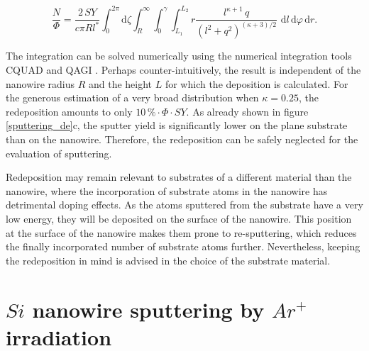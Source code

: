 \begin{equation}
\label{prob3}
\frac{N}{\Phi} = \frac{2\,SY}{c \pi Rl^*} \int_0^{2\pi}\! \mathrm{d}\zeta \int_R^{\infty} \!
\int_0^{\gamma} \! \int_{L_1}^{L_2} \! r \frac{l^{\kappa+1}\,q}{(l^2 + q^2)^{(\kappa + 3)/2}}\,\,\mathrm{d}l \, \mathrm{d}\varphi\,\mathrm{d}r.
\end{equation}

The integration can be solved numerically using the numerical integration tools CQUAD and QAGI \cite{gough_gnu_2009}. Perhaps counter-intuitively, the result is independent of the nanowire radius $R$ and the height $L$ for which the deposition is calculated. For the generous estimation of a very broad distribution when $\kappa = 0.25$, the redeposition amounts to only $10\,\% \cdot \Phi\cdot SY$. As already shown in figure \ref{sputtering_de}c, the sputter yield is significantly lower on the plane substrate than on the nanowire. Therefore, the redeposition can be safely neglected for the evaluation of sputtering. 

Redeposition may remain relevant to substrates of a different material than the nanowire, where the incorporation of substrate atoms in the nanowire has detrimental doping effects. As the atoms sputtered from the substrate have a very low energy, they will be deposited on the surface of the nanowire. This position at the surface of the nanowire makes them prone to re-sputtering, which reduces the finally incorporated number of substrate atoms further. Nevertheless, keeping the redeposition in mind is advised in the choice of the substrate material.






\section{$Si$ nanowire sputtering by $Ar^+$ irradiation}
\label{sec:sisputtering}

